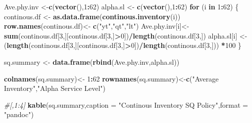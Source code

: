 \documentclass[
]{article}
\newenvironment{Shaded}{\begin{snugshade}}{\end{snugshade}}
\newcommand{\CommentTok}[1]{\textcolor[rgb]{0.56,0.35,0.01}{\textit{#1}}}
\newcommand{\ControlFlowTok}[1]{\textcolor[rgb]{0.13,0.29,0.53}{\textbf{#1}}}
\newcommand{\DataTypeTok}[1]{\textcolor[rgb]{0.13,0.29,0.53}{#1}}
\newcommand{\DecValTok}[1]{\textcolor[rgb]{0.00,0.00,0.81}{#1}}
\newcommand{\KeywordTok}[1]{\textcolor[rgb]{0.13,0.29,0.53}{\textbf{#1}}}
\newcommand{\NormalTok}[1]{#1}
\newcommand{\OperatorTok}[1]{\textcolor[rgb]{0.81,0.36,0.00}{\textbf{#1}}}
\newcommand{\StringTok}[1]{\textcolor[rgb]{0.31,0.60,0.02}{#1}}
\begin{document}
\begin{Shaded}
\begin{Highlighting}[]
\NormalTok{Ave.phy.inv <-}\KeywordTok{c}\NormalTok{(}\KeywordTok{vector}\NormalTok{(),}\DecValTok{1}\OperatorTok{:}\DecValTok{62}\NormalTok{)}
\NormalTok{alpha.sl <-}\StringTok{ }\KeywordTok{c}\NormalTok{(}\KeywordTok{vector}\NormalTok{(),}\DecValTok{1}\OperatorTok{:}\DecValTok{62}\NormalTok{)}
\ControlFlowTok{for}\NormalTok{ (i }\ControlFlowTok{in} \DecValTok{1}\OperatorTok{:}\DecValTok{62}\NormalTok{) \{}
\NormalTok{  continous.df <-}\StringTok{ }\KeywordTok{as.data.frame}\NormalTok{(}\KeywordTok{continous.inventory}\NormalTok{(i))}
  \KeywordTok{row.names}\NormalTok{(continous.df)<-}\StringTok{ }\KeywordTok{c}\NormalTok{(}\StringTok{"yt"}\NormalTok{,}\StringTok{"qt"}\NormalTok{,}\StringTok{"lt"}\NormalTok{)}
\NormalTok{  Ave.phy.inv[i]<-}\StringTok{ }\KeywordTok{sum}\NormalTok{(continous.df[}\DecValTok{3}\NormalTok{,][continous.df[}\DecValTok{3}\NormalTok{,]}\OperatorTok{>}\DecValTok{0}\NormalTok{])}\OperatorTok{/}\KeywordTok{length}\NormalTok{(continous.df[}\DecValTok{3}\NormalTok{,])}
\NormalTok{  alpha.sl[i] <-}\StringTok{ }\NormalTok{(}\KeywordTok{length}\NormalTok{(continous.df[}\DecValTok{3}\NormalTok{,][continous.df[}\DecValTok{3}\NormalTok{,]}\OperatorTok{>}\DecValTok{0}\NormalTok{])}\OperatorTok{/}\KeywordTok{length}\NormalTok{(continous.df[}\DecValTok{3}\NormalTok{,])) }\OperatorTok{*}\DecValTok{100}
\NormalTok{\}}

\NormalTok{sq.summary <-}\StringTok{ }\KeywordTok{data.frame}\NormalTok{(}\KeywordTok{rbind}\NormalTok{(Ave.phy.inv,alpha.sl))}

\KeywordTok{colnames}\NormalTok{(sq.summary)<-}\StringTok{ }\DecValTok{1}\OperatorTok{:}\DecValTok{62}
\KeywordTok{rownames}\NormalTok{(sq.summary)<-}\KeywordTok{c}\NormalTok{(}\StringTok{"Average Inventory"}\NormalTok{,}\StringTok{"Alpha Service Level"}\NormalTok{)}

\CommentTok{#[,1:4]}
\KeywordTok{kable}\NormalTok{(sq.summary,}\DataTypeTok{caption =} \StringTok{"Continous Inventory SQ Policy"}\NormalTok{,}\DataTypeTok{format =} \StringTok{"pandoc"}\NormalTok{)}
\end{Highlighting}
\end{Shaded}
\end{document}
